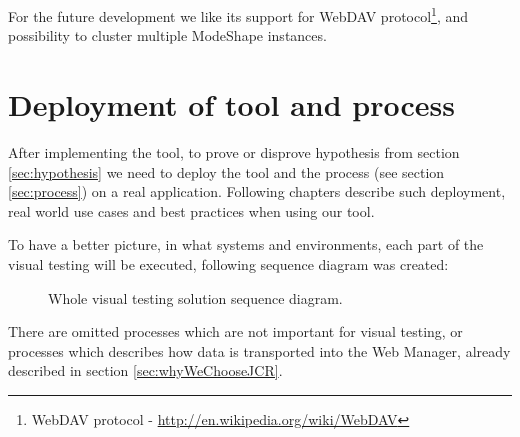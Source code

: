 \documentclass[11pt,oneside,final]{fithesis2}
\begin{document}
    For the future development we like its support for 
    WebDAV protocol\footnote{WebDAV protocol - \url{http://en.wikipedia.org/wiki/WebDAV}}, and possibility to cluster multiple
    ModeShape instances.
    
\chapter{Deployment of tool and process}
After implementing the tool, to prove or disprove hypothesis from section \ref{sec:hypothesis} we need to deploy the tool and the
process (see section \ref{sec:process}) on a real application. Following chapters describe such deployment, real world use cases
and best practices when using our tool.

To have a better picture, in what systems and environments, each part of the visual testing will be executed, following
sequence diagram was created:

\begin{figure}[!htb]
      \begin{center}
      \leavevmode
      \centerline{}
      \end{center}
      \caption{Whole visual testing solution sequence diagram.}
      \label{fig:wholeSolutionSequenceDiagram}
\end{figure}

There are omitted processes which are not important for visual testing, or processes which describes how data is transported into
the Web Manager, already described in section \ref{sec:whyWeChooseJCR}.
  
\end{document}
